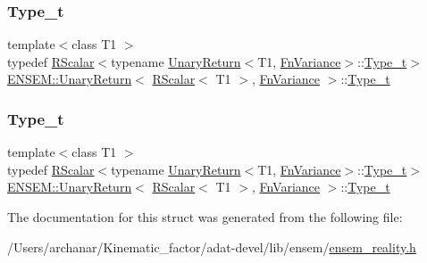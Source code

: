 \subsubsection{\texorpdfstring{Type\_t}{Type\_t}\hspace{0.1cm}{\footnotesize\ttfamily [2/3]}}
{\footnotesize\ttfamily template$<$class T1 $>$ \\
typedef \mbox{\hyperlink{classENSEM_1_1RScalar}{R\+Scalar}}$<$typename \mbox{\hyperlink{structENSEM_1_1UnaryReturn}{Unary\+Return}}$<$T1, \mbox{\hyperlink{structENSEM_1_1FnVariance}{Fn\+Variance}}$>$\+::\mbox{\hyperlink{structENSEM_1_1UnaryReturn_3_01RScalar_3_01T1_01_4_00_01FnVariance_01_4_aadaa55c2cab1c15c97829d8d0a69b228}{Type\+\_\+t}}$>$ \mbox{\hyperlink{structENSEM_1_1UnaryReturn}{E\+N\+S\+E\+M\+::\+Unary\+Return}}$<$ \mbox{\hyperlink{classENSEM_1_1RScalar}{R\+Scalar}}$<$ T1 $>$, \mbox{\hyperlink{structENSEM_1_1FnVariance}{Fn\+Variance}} $>$\+::\mbox{\hyperlink{structENSEM_1_1UnaryReturn_3_01RScalar_3_01T1_01_4_00_01FnVariance_01_4_aadaa55c2cab1c15c97829d8d0a69b228}{Type\+\_\+t}}}

\mbox{\label{structENSEM_1_1UnaryReturn_3_01RScalar_3_01T1_01_4_00_01FnVariance_01_4_aadaa55c2cab1c15c97829d8d0a69b228}} 
\subsubsection{\texorpdfstring{Type\_t}{Type\_t}\hspace{0.1cm}{\footnotesize\ttfamily [3/3]}}
{\footnotesize\ttfamily template$<$class T1 $>$ \\
typedef \mbox{\hyperlink{classENSEM_1_1RScalar}{R\+Scalar}}$<$typename \mbox{\hyperlink{structENSEM_1_1UnaryReturn}{Unary\+Return}}$<$T1, \mbox{\hyperlink{structENSEM_1_1FnVariance}{Fn\+Variance}}$>$\+::\mbox{\hyperlink{structENSEM_1_1UnaryReturn_3_01RScalar_3_01T1_01_4_00_01FnVariance_01_4_aadaa55c2cab1c15c97829d8d0a69b228}{Type\+\_\+t}}$>$ \mbox{\hyperlink{structENSEM_1_1UnaryReturn}{E\+N\+S\+E\+M\+::\+Unary\+Return}}$<$ \mbox{\hyperlink{classENSEM_1_1RScalar}{R\+Scalar}}$<$ T1 $>$, \mbox{\hyperlink{structENSEM_1_1FnVariance}{Fn\+Variance}} $>$\+::\mbox{\hyperlink{structENSEM_1_1UnaryReturn_3_01RScalar_3_01T1_01_4_00_01FnVariance_01_4_aadaa55c2cab1c15c97829d8d0a69b228}{Type\+\_\+t}}}



The documentation for this struct was generated from the following file\+:\begin{DoxyCompactItemize}
\item 
/\+Users/archanar/\+Kinematic\+\_\+factor/adat-\/devel/lib/ensem/\mbox{\hyperlink{adat-devel_2lib_2ensem_2ensem__reality_8h}{ensem\+\_\+reality.\+h}}\end{DoxyCompactItemize}
